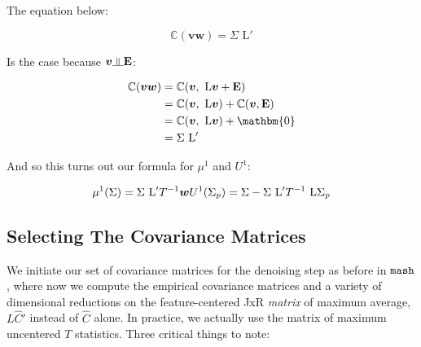 \documentclass[11pt, oneside]{article}   	%
\newcommand{\indep}{\rotatebox[origin=c]{90}{$\models$}}
\newcommand{\Cov}{\mathbb{C}} %
\newcommand{\wfit}{\bm{w}}
\newcommand{\vb}{\bm{v}}
\def\lstar{\text{ L}}
\def\mash{{\tt mash }}
\begin{document}
\begin{itemize}
The equation below: 

\begin{equation}
 \Cov(\vb \wfit ) = \Sigma \lstar'
 \end{equation}
 
 Is the case because  $\vb \indep \mathbf{E}$:

\begin{center}
\begin{equation}
\begin{aligned}
\Cov(\vb \wfit ) &=  \Cov(\vb , \lstar \vb  + \mathbf{E}) \\
&= \Cov(\vb , \lstar \vb ) +\Cov(\vb , \mathbf{E}) \\
&= \Cov(\vb , \lstar \vb ) + \mathbm{0} \\
&= \Sigma \lstar' \\
\end{aligned} 
\end{equation}
\end{center}


And so this turns out our formula for $\mu^{1}$ and $U^{1}$:

\begin{center}
\begin{equation}
\mu^{1} ( \Sigma ) = \Sigma \lstar ' T^{-1} \wfit  \\
U^{1} ( \Sigma_p ) = \Sigma - \Sigma \lstar ' T^{-1} \lstar  \Sigma_{p}\\
\end{equation}
\end{center}

\subsection{Selecting The Covariance Matrices}

We initiate our set of covariance matrices for the denoising step as before in $\mash$, where now we compute the empirical covariance matrices and a variety of dimensional reductions on the feature-centered JxR \textit{matrix} of maximum average, $L \hat{C}' $ instead of $\hat{C}$ alone. In practice, we actually use the matrix of maximum uncentered $T$ statistics. Three critical things to note:


\end{itemize}
\end{document}

